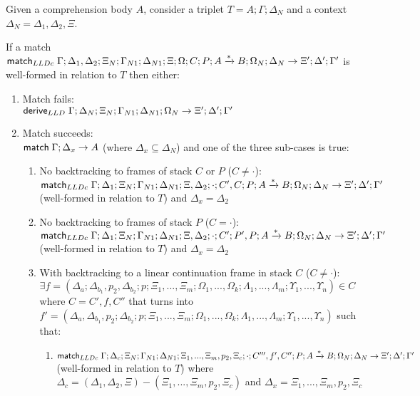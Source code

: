 \begin{lemma}\label{thm:comprehension_body_match}
Given a comprehension body $A$, consider a triplet $T = A; \Gamma; \Delta_{N}$ and a context $\Delta_{N} = \Delta_1, \Delta_2, \Xi$.

If a match $\mathsf{match}_{LLDc} \; \Gamma; \Delta_1, \Delta_2; \Xi_N; \Gamma_{N1}; \Delta_{N1}; \Xi; \Omega; C; P; A \xrightarrow{*} B; \Omega_N; \Delta_N \rightarrow \Xi'; \Delta'; \Gamma'$ is well-formed in relation to $T$ then either:

   \begin{enumerate}
      \item Match fails: \\
      $\mathsf{derive}_{LLD} \; \Gamma; \Delta_N; \Xi_N; \Gamma_{N1}; \Delta_{N1}; \Omega_N \rightarrow \Xi'; \Delta'; \Gamma'$
      
      \item Match succeeds: \\
      $\mathsf{match} \; \Gamma; \Delta_x \rightarrow A$ (where $\Delta_x \subseteq \Delta_N$) and one of the three sub-cases is true:
      \begin{enumerate}
         \item No backtracking to frames of stack $C$ or $P$ ($C \neq \cdot$):\\
            $\mathsf{match}_{LLDc} \; \Gamma; \Delta_1; \Xi_N; \Gamma_{N1}; \Delta_{N1}; \Xi, \Delta_2; \cdot; C', C; P; A \xrightarrow{*} B; \Omega_N; \Delta_N \rightarrow \Xi'; \Delta'; \Gamma'$ (well-formed in relation to $T$) and $\Delta_x = \Delta_2$
         \item No backtracking to frames of stack $P$ ($C = \cdot$):\\
         $\mathsf{match}_{LLDc} \; \Gamma; \Delta_1; \Xi_N; \Gamma_{N1}; \Delta_{N1}; \Xi, \Delta_2; \cdot; C'; P', P; A \xrightarrow{*} B; \Omega_N; \Delta_N \rightarrow \Xi'; \Delta'; \Gamma'$ (well-formed in relation to $T$) and $\Delta_x = \Delta_2$
         
         \item With backtracking to a linear continuation frame in stack $C$ ($C \neq \cdot$):\\
         $\exists f = (\Delta_a; \Delta_{b_1}, p_2, \Delta_{b_2}; p; \Xi_1, ..., \Xi_m; \Omega_1, ..., \Omega_k; \Lambda_1, ..., \Lambda_m; \Upsilon_1, ..., \Upsilon_n) \in C$ where $C = C', f, C''$ that turns into $f' = (\Delta_a, \Delta_{b_1}, p_2; \Delta_{b_2}; p; \Xi_1, ..., \Xi_m; \Omega_1, ..., \Omega_k; \Lambda_1, ..., \Lambda_m; \Upsilon_1, ..., \Upsilon_n)$ such that:
         \begin{enumerate}
            \item $\mathsf{match}_{LLDc} \; \Gamma; \Delta_c; \Xi_N; \Gamma_{N1}; \Delta_{N1}; \Xi_1, ..., \Xi_m, p_2, \Xi_c; \cdot; C''', f', C''; P; A \xrightarrow{*} B; \Omega_N; \Delta_N \rightarrow \Xi'; \Delta'; \Gamma'$ (well-formed in relation to $T$) where $\Delta_c = (\Delta_1, \Delta_2, \Xi) - (\Xi_1, ..., \Xi_m, p_2, \Xi_c)$ and $\Delta_x = \Xi_1, ..., \Xi_m, p_2, \Xi_c$
         \end{enumerate}
            

\end{enumerate}
\end{enumerate}
\end{lemma}
